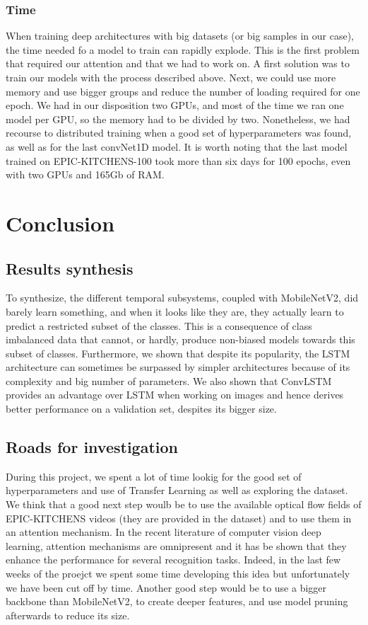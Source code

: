 \documentclass[12pt, a4paper]{report}
\begin{document}
			\subsection{Time}
				When training deep architectures with big datasets (or big samples in our case), the time needed fo a model to train can rapidly explode.
				This is the first problem that required our attention and that we had to work on.
				A first solution was to train our models with the process described above.
				Next, we could use more memory and use bigger groups and reduce the number of loading required for one epoch.
				We had in our disposition two GPUs, and most of the time we ran one model per GPU, so the memory had to be divided by two.
				Nonetheless, we had recourse to distributed training when a good set of hyperparameters was found, as well as for the last convNet1D model.
				It is worth noting that the last model trained on EPIC-KITCHENS-100 took more than six days for 100 epochs, even with two GPUs and 165Gb of RAM.
	\chapter{Conclusion}
		\section*{Results synthesis}
			To synthesize, the different temporal subsystems, coupled with MobileNetV2, did barely learn something, and when it looks like they are, they actually learn to predict a restricted subset of the classes.
			This is a consequence of class imbalanced data that cannot, or hardly, produce non-biased models towards this subset of classes.
			Furthermore, we shown that despite its popularity, the LSTM architecture can sometimes be surpassed by simpler architectures because of its complexity and big number of parameters.
			We also shown that ConvLSTM provides an advantage over LSTM when working on images and hence derives better performance on a validation set, despites its bigger size.
		\section*{Roads for investigation}
			During this project, we spent a lot of time lookig for the good set of hyperparameters and use of Transfer Learning as well as exploring the dataset.
			We think that a good next step woulb be to use the available optical flow fields of EPIC-KITCHENS videos (they are provided in the dataset) and to use them in an attention mechanism.
			In the recent literature of computer vision deep learning, attention mechanisms are omnipresent and it has be shown that they enhance the performance for several recognition tasks.
			Indeed, in the last few weeks of the proejct we spent some time developing this idea but unfortunately we have been cut off by time.
			Another good step would be to use a bigger backbone than MobileNetV2, to create deeper features, and use model pruning afterwards to reduce its size.
\end{document}
